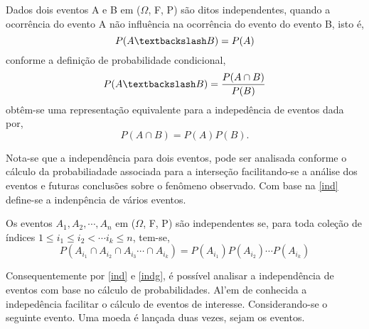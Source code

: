  \begin{defin} 
   Dados dois eventos A e B em ($\Omega$, F, P) s\~{a}o ditos independentes, quando a ocorr\^{e}ncia do evento A n\~{a}o
	 influ\^{e}ncia na ocorr\^{e}ncia do evento do evento B, isto \'{e},
	 \begin{equation*}
	   P(A \textbackslash B) = P(A)
	 \end{equation*}
	 conforme a defini\c{c}\~{a}o de probabilidade condicional,
	 \begin{equation*}
	   P(A \textbackslash B) =  \frac{P(A \cap B)} {P(B)}
	 \end{equation*}
	 obt\^{e}m-se uma representa\c{c}\~{a}o equivalente para a indeped\^{e}ncia de eventos dada por,
	 \begin{equation*}
	  P(A \cap B) = P(A)P(B). 
	 \end{equation*}
	 \label{ind}
   \end{defin}
   Nota-se que a independ\^{e}ncia para dois eventos, pode ser analisada conforme o c\'{a}lculo da probabiliadade associada para
   a interse\c{c}\~{a}o facilitando-se a an\'{a}lise dos eventos e futuras conclus\~{o}es sobre o fen\^{o}meno observado. Com base na 
   \ref{ind} define-se a indenp\^{e}ncia de v\'{a}rios eventos.
   \begin{defin}
	 Os eventos $A_1,A_2,\cdots ,A_n $ em ($\Omega$, F, P) s\~{a}o independentes se, para toda cole\c{c}\~{a}o de \'{i}ndices
	 $ 1 \leq i_1 \leq i_2 < \cdots i_k \leq n $, tem-se, 
	 \begin{equation*}
	   P(A_{i_1} \cap A_{i_2} \cap A_{i_3} \cdots \cap A_{i_k}) = P(A_{i_1})P(A_{i_2}) \cdots P(A_{i_k})
	 \end{equation*}
	 \label{indg}
   \end{defin}
   Consequentemente por \ref{ind} e \ref{indg}, \'{e} poss\'{i}vel analisar a independ\^{e}ncia de eventos com base no c\'{a}lculo
   de probabilidades. Al'{e}m de conhecida a indeped\^{e}ncia facilitar o c\'{a}lculo de eventos de interesse. Considerando-se o 
   seguinte evento. Uma moeda \'{e} lan\c{c}ada duas vezes, sejam os eventos.

